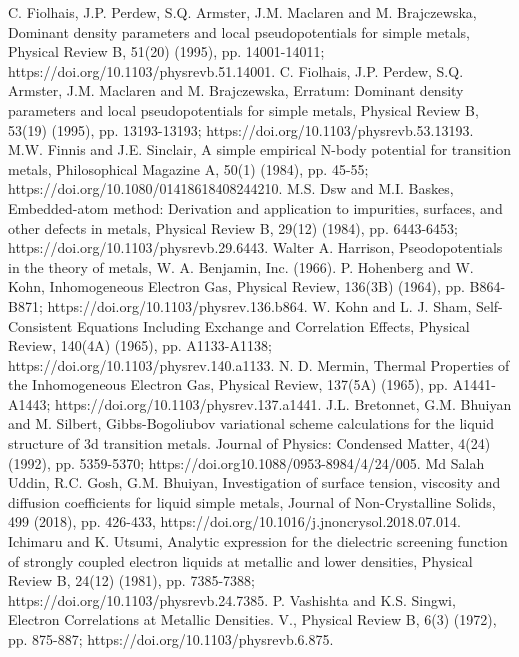 \documentclass[final12pt]{elsarticle}
\begin{document}
\begin{thebibliography}{thesis}
C. Fiolhais, J.P. Perdew, S.Q. Armster, J.M. Maclaren and M. Brajczewska, Dominant density parameters and local pseudopotentials for simple metals, Physical Review B, 51(20) (1995), pp. 14001-14011; https://doi.org/10.1103/physrevb.51.14001.
C. Fiolhais, J.P. Perdew, S.Q. Armster, J.M. Maclaren and M. Brajczewska, Erratum: Dominant density parameters and local pseudopotentials for simple metals, Physical Review B, 53(19) (1995), pp. 13193-13193; https://doi.org/10.1103/physrevb.53.13193.
M.W. Finnis and J.E. Sinclair, A simple empirical N-body potential for transition metals, Philosophical Magazine A, 50(1) (1984), pp. 45-55; https://doi.org/10.1080/01418618408244210.
M.S. Dsw and M.I. Baskes, Embedded-atom method: Derivation and application to impurities, surfaces, and other defects in metals, Physical Review B, 29(12) (1984), pp. 6443-6453; https://doi.org/10.1103/physrevb.29.6443.
Walter A. Harrison, Pseodopotentials in the theory of metals, W. A. Benjamin, Inc. (1966).
P. Hohenberg and W. Kohn, Inhomogeneous Electron Gas, Physical Review, 136(3B) (1964), pp. B864-B871; https://doi.org/10.1103/physrev.136.b864.
W. Kohn and L. J. Sham, Self-Consistent Equations Including Exchange and Correlation Effects, Physical Review, 140(4A) (1965), pp. A1133-A1138; https://doi.org/10.1103/physrev.140.a1133.
N. D. Mermin, Thermal Properties of the Inhomogeneous Electron Gas, Physical Review, 137(5A) (1965), pp. A1441-A1443; https://doi.org/10.1103/physrev.137.a1441.
J.L. Bretonnet, G.M. Bhuiyan and M. Silbert, Gibbs-Bogoliubov variational scheme calculations for the liquid structure of 3d transition metals. Journal of Physics: Condensed Matter, 4(24) (1992), pp. 5359-5370; https://doi.org10.1088/0953-8984/4/24/005.
Md Salah Uddin, R.C. Gosh, G.M. Bhuiyan, Investigation of surface tension, viscosity and diffusion coefficients for liquid simple metals, Journal of Non-Crystalline Solids, 499 (2018), pp. 426-433, https://doi.org/10.1016/j.jnoncrysol.2018.07.014.
Ichimaru and K. Utsumi, Analytic expression for the dielectric screening function of strongly coupled electron liquids at metallic and lower densities, Physical Review B, 24(12) (1981), pp.  7385-7388; https://doi.org/10.1103/physrevb.24.7385.
P. Vashishta and K.S. Singwi, Electron Correlations at Metallic Densities. V., Physical Review B, 6(3) (1972), pp. 875-887; https://doi.org/10.1103/physrevb.6.875.

\end{thebibliography}
\end{document}
